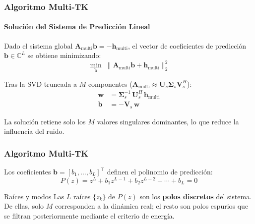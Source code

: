 \documentclass{beamer}
\begin{document}
\begin{frame}
\frametitle{Algoritmo Multi‑TK}
\framesubtitle{Solución del Sistema de Predicción Lineal}

Dado el sistema global $\mathbf{A}_{\text{multi}}\mathbf{b} = -\mathbf{h}_{\text{multi}}$,
el vector de coeficientes de predicción $\mathbf{b}\in\mathbb{C}^{L}$ se obtiene minimizando:
\begin{equation}
    \min_{\mathbf{b}}\; \|\mathbf{A}_{\text{multi}}\mathbf{b} + \mathbf{h}_{\text{multi}}\|_2^2
    \label{eq:ls}
\end{equation}

Tras la SVD truncada a $M$ componentes ($\mathbf{A}_{\text{multi}} \approx \mathbf{U}_s \boldsymbol{\Sigma}_s \mathbf{V}_s^H$):
\begin{align}
    \mathbf{w} &= \boldsymbol{\Sigma}_s^{-1}\,\mathbf{U}_s^H\,\mathbf{h}_{\text{multi}}
                 \label{eq:weights}\\[4pt]
    \mathbf{b} &= -\mathbf{V}_s\,\mathbf{w}
                 \label{eq:bcoeffs}
\end{align}

\vspace{0.3em}
La solución retiene solo los $M$ valores singulares dominantes, lo que reduce la influencia del ruido.
\end{frame}
\begin{frame}

\frametitle{Algoritmo Multi‑TK}

Los coeficientes $\mathbf{b}=[b_1,\dots,b_L]^\top$ definen el polinomio de  predicción:
\begin{equation}
    P(z) = z^L + b_1 z^{L-1} + b_2 z^{L-2} + \cdots + b_L = 0
    \label{eq:pred_poly}
\end{equation}

\begin{exampleblock}{Raíces y modos}
    Las $L$ raíces $\{z_k\}$ de $P(z)$ son los \textbf{polos discretos} del sistema.
    De ellas, solo $M$ corresponden a la dinámica real; el resto son polos
    espurios que se filtran posteriormente mediante el criterio de energía.
\end{exampleblock}
\end{frame}
\end{document}
